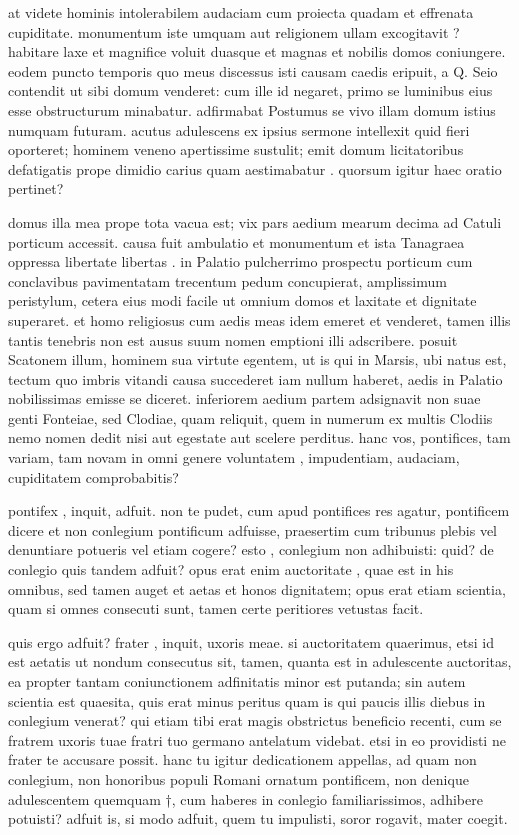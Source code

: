 at videte hominis intolerabilem audaciam cum proiecta quadam et effrenata cupiditate. monumentum iste umquam aut religionem ullam excogitavit ? habitare laxe et magnifice voluit duasque et magnas et nobilis domos coniungere. eodem puncto temporis quo meus discessus isti causam caedis eripuit, a Q. Seio contendit ut sibi domum venderet: cum ille id negaret, primo se luminibus eius esse obstructurum minabatur. adfirmabat Postumus se vivo illam domum istius numquam futuram. acutus adulescens ex ipsius sermone intellexit quid fieri oporteret; hominem veneno apertissime sustulit; emit domum licitatoribus defatigatis prope dimidio carius quam aestimabatur . quorsum igitur haec oratio pertinet?

 domus illa mea prope tota vacua est; vix pars aedium mearum decima ad Catuli porticum accessit. causa fuit ambulatio et monumentum et ista Tanagraea oppressa libertate libertas . in Palatio pulcherrimo prospectu porticum cum conclavibus pavimentatam trecentum pedum concupierat, amplissimum peristylum, cetera eius modi facile ut omnium domos et laxitate et dignitate superaret. et homo religiosus cum aedis meas idem emeret et venderet, tamen illis tantis tenebris non est ausus suum nomen emptioni illi adscribere. posuit Scatonem illum, hominem sua virtute egentem, ut is qui in Marsis, ubi natus est, tectum quo imbris vitandi causa succederet iam nullum haberet, aedis in Palatio nobilissimas emisse se diceret. inferiorem aedium partem adsignavit non suae genti Fonteiae, sed Clodiae, quam reliquit, quem in numerum ex multis Clodiis nemo nomen dedit nisi aut egestate aut scelere perditus. hanc vos, pontifices, tam variam, tam novam in omni genere voluntatem , impudentiam, audaciam, cupiditatem comprobabitis?

 pontifex , inquit, adfuit. non te pudet, cum apud pontifices res agatur, pontificem dicere et non conlegium pontificum adfuisse, praesertim cum tribunus plebis vel denuntiare potueris vel etiam cogere? esto , conlegium non adhibuisti: quid? de conlegio quis tandem adfuit? opus erat enim auctoritate , quae est in his omnibus, sed tamen auget et aetas et honos dignitatem; opus erat etiam scientia, quam si omnes consecuti sunt, tamen certe peritiores vetustas facit.

 quis ergo adfuit? frater , inquit, uxoris meae. si auctoritatem quaerimus, etsi id est aetatis ut nondum consecutus sit, tamen, quanta est in adulescente auctoritas, ea propter tantam coniunctionem adfinitatis minor est putanda; sin autem scientia est quaesita, quis erat minus peritus quam is qui paucis illis diebus in conlegium venerat? qui etiam tibi erat magis obstrictus beneficio recenti, cum se fratrem uxoris tuae fratri tuo germano antelatum videbat. etsi in eo providisti ne frater te accusare possit. hanc tu igitur dedicationem appellas, ad quam non conlegium, non honoribus populi Romani ornatum pontificem, non denique adulescentem quemquam †, cum haberes in conlegio familiarissimos, adhibere potuisti? adfuit is, si modo adfuit, quem tu impulisti, soror rogavit, mater coegit.

